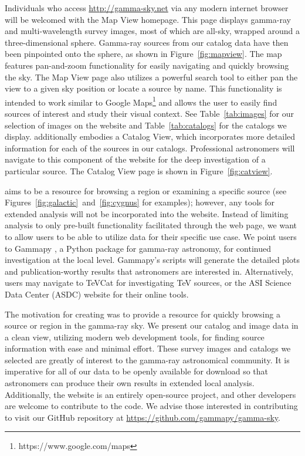Individuals who access \url{http://gamma-sky.net} via any modern internet browser will be welcomed with the Map View homepage. This page displays gamma-ray and multi-wavelength survey images, most of which are all-sky, wrapped around a three-dimensional sphere. Gamma-ray sources from our catalog data have then been pinpointed onto the sphere, as shown in Figure~\ref{fig:mapview}. The map features pan-and-zoom functionality for easily navigating and quickly browsing the sky. The Map View page also utilizes a powerful search tool to either pan the view to a given sky position or locate a source by name. This functionality is intended to work similar to Google Maps\footnote[1]{https://www.google.com/maps} and allows the user to easily find sources of interest and study their visual context. See Table~\ref{tab:images} for our selection of images on the website and Table~\ref{tab:catalogs} for the catalogs we display. \gammasky additionally embodies a Catalog View, which incorporates more detailed information for each of the sources in our catalogs. Professional astronomers will navigate to this component of the website for the deep investigation of a particular source. The Catalog View page is shown in Figure~\ref{fig:catview}.





\gammasky aims to be a resource for browsing a region or examining a specific source (see Figures~\ref{fig:galactic}~and~\ref{fig:cygnus} for examples); however, any tools for extended analysis will not be incorporated into the website. Instead of limiting analysis to only pre-built functionality facilitated through the web page, we want to allow users to be able to utilize data for their specific use case. We point users to Gammapy \cite{gammapy}, a Python package for gamma-ray astronomy, for continued investigation at the local level. Gammapy's scripts will generate the detailed plots and publication-worthy results that astronomers are interested in. Alternatively, users may navigate to TeVCat \cite{tevcat} for investigating TeV sources, or the ASI Science Data Center (ASDC) website for their online tools.


The motivation for creating \gammasky was to provide a resource for quickly browsing a source or region in the gamma-ray sky. We present our catalog and image data in a clean view, utilizing modern web development tools, for finding source information with ease and minimal effort. These survey images and catalogs we selected are greatly of interest to the gamma-ray astronomical community. It is imperative for all of our data to be openly available for download so that astronomers can produce their own results in extended local analysis. Additionally, the website is an entirely open-source project, and other developers are welcome to contribute to the code. We advise those interested in contributing to visit our GitHub repository at \url{https://github.com/gammapy/gamma-sky}.

